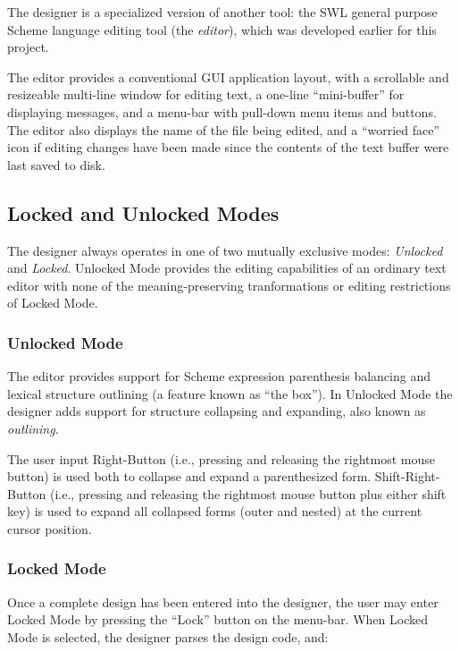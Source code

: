 \documentclass{article}
\begin{document}
The designer is a specialized version of another tool: the {\sc SWL}
general purpose Scheme language editing tool (the {\em editor}), which
was developed earlier for this project.

The editor provides a conventional GUI application layout, with a
scrollable and resizeable multi-line window for editing text, a
one-line ``mini-buffer'' for displaying messages, and a menu-bar with
pull-down menu items and buttons.  The editor also displays the name
of the file being edited, and a ``worried face'' icon if editing
changes have been made since the contents of the text buffer were last
saved to disk.

\subsection{Locked and Unlocked Modes}

The designer always operates in one of two mutually exclusive modes:
{\em Unlocked} and {\em Locked}.  Unlocked Mode provides the editing
capabilities of an ordinary text editor with none of the
meaning-preserving tranformations or editing restrictions of Locked Mode.

\subsubsection{Unlocked Mode}

The editor provides support for Scheme expression parenthesis
balancing and lexical structure outlining (a feature known as ``the
box'').  In Unlocked Mode the designer adds support for structure
collapsing and expanding, also known as {\em outlining}.

The user input Right-Button (i.e., pressing and releasing the
rightmost mouse button) is used both to collapse and expand a
parenthesized form.  Shift-Right-Button (i.e., pressing and releasing
the rightmost mouse button plus either shift key) is used to expand
all collapsed forms (outer and nested) at the current cursor position.


\subsubsection{Locked Mode}

Once a complete design has been entered into the designer, the user
may enter Locked Mode by pressing the ``Lock'' button on the menu-bar.
When Locked Mode is selected, the designer parses the design code,
and:
\end{document}
